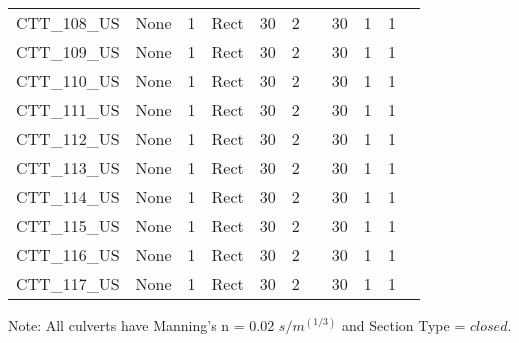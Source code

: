\begin{table}[]
\begin{tabular}{@{}lcccccccccc@{}}
CTT\_108\_US  & None       & 1        & Rect & 30     & 2     &          & 30     & 1         & 1          \\
CTT\_109\_US  & None       & 1        & Rect & 30     & 2     &          & 30     & 1         & 1          \\
CTT\_110\_US  & None       & 1        & Rect & 30     & 2     &          & 30     & 1         & 1          \\
CTT\_111\_US  & None       & 1        & Rect & 30     & 2     &          & 30     & 1         & 1          \\
CTT\_112\_US  & None       & 1        & Rect & 30     & 2     &          & 30     & 1         & 1          \\
CTT\_113\_US  & None       & 1        & Rect & 30     & 2     &          & 30     & 1         & 1          \\
CTT\_114\_US  & None       & 1        & Rect & 30     & 2     &          & 30     & 1         & 1          \\
CTT\_115\_US  & None       & 1        & Rect & 30     & 2     &          & 30     & 1         & 1          \\
CTT\_116\_US  & None       & 1        & Rect & 30     & 2     &          & 30     & 1         & 1          \\
CTT\_117\_US  & None       & 1        & Rect & 30     & 2     &          & 30     & 1         & 1          \\
\bottomrule
\end{tabular}

Note: All culverts have Manning's n = 0.02 $s/m^{(1/3)}$ and Section Type = $closed$.
\end{table}
\clearpage


